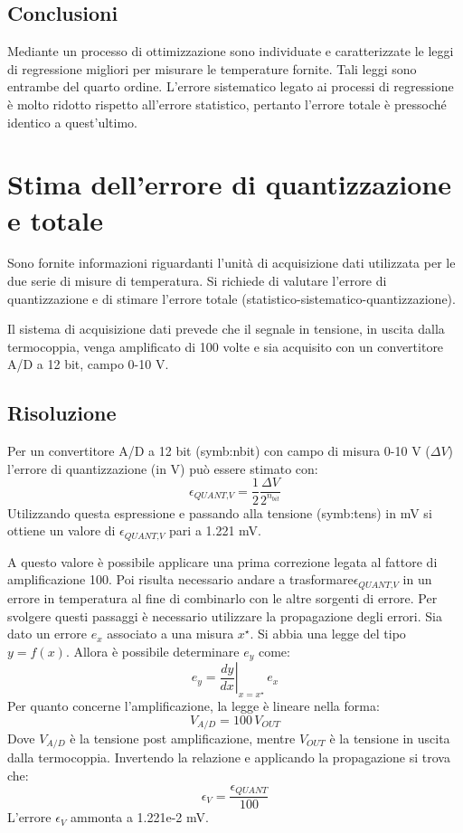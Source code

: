 \subsection{Conclusioni}
Mediante un processo di ottimizzazione sono individuate e caratterizzate le leggi di regressione migliori per misurare le temperature fornite. Tali leggi sono entrambe del quarto ordine. L'errore sistematico legato ai processi di regressione è molto ridotto rispetto all'errore statistico, pertanto l'errore totale è pressoché identico a quest'ultimo. 




\clearpage
\section{Stima dell'errore di quantizzazione e totale}
Sono fornite informazioni riguardanti l'unità di acquisizione dati utilizzata per le due serie di misure di temperatura. Si richiede di valutare l'errore di quantizzazione e di stimare l'errore totale (statistico-sistematico-quantizzazione).

Il sistema di acquisizione dati prevede che il segnale in tensione, in uscita dalla termocoppia, venga amplificato di 100 volte e sia acquisito con un convertitore A/D a 12 bit, campo 0-10 V.

\subsection{Risoluzione}
Per un convertitore A/D a 12 bit (\gls{symb:nbit}) con campo di misura 0-10 V ($\Delta V$) l'errore di quantizzazione (in V) può essere stimato con: 
\begin{equation}
	\epsilon_{\textit{QUANT,V}} = \frac{1}{2} \frac{\Delta V}{2^{n_{bit}}}
\end{equation}
Utilizzando questa espressione e passando alla tensione (\gls{symb:tens}) in mV si ottiene un valore di $\epsilon_{\textit{QUANT,V}} $ pari a 1.221 mV. 

A questo valore è possibile applicare una prima correzione legata al fattore di amplificazione 100. Poi risulta necessario andare a trasformare$\epsilon_{\textit{QUANT,V}}$ in un errore in temperatura al fine di combinarlo con le altre sorgenti di errore. 
Per svolgere questi passaggi è necessario utilizzare la propagazione degli errori. Sia dato un errore $e_x$ associato a una misura $x^\star$. Si abbia una legge del tipo $y=f(x)$. Allora è possibile determinare $e_y$ come:
\begin{equation}
	e_y = \left. \frac{dy}{dx} \right\vert _{x=x^\star} \, e_x
\end{equation}
Per quanto concerne l'amplificazione, la legge è lineare nella forma:
\begin{equation}
	V_{A/D} = 100\, V_{OUT}
\end{equation}
Dove $V_{A/D}$ è la tensione post amplificazione, mentre $V_{OUT}$ è la tensione in uscita dalla termocoppia. Invertendo la relazione e applicando la propagazione si trova che:
\begin{equation}
	\epsilon_{\textit{V}} = \frac{\epsilon_{\textit{QUANT}}}{100}
\end{equation}
L'errore $\epsilon_{\textit{V}}$ ammonta a 1.221e-2 mV.

